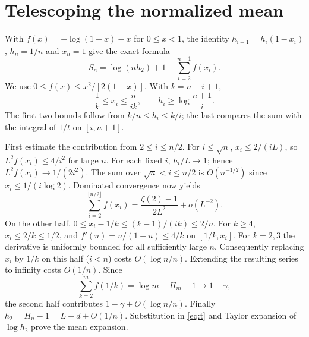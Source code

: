 \documentclass[11pt]{article}
\begin{document}
\section{Telescoping the normalized mean}
With $f(x)=-\log(1-x)-x$ for $0\le x<1$, the identity $h_{i+1}=h_i(1-x_i)$, $h_n=1/n$ and $x_n=1$ give the exact formula
\begin{equation}
 S_n=\log(n h_2)+1-\sum_{i=2}^{n-1}f(x_i).\label{eq:t}
\end{equation}
We use $0\le f(x)\le x^2/[2(1-x)]$. With $k=n-i+1$,
\begin{equation}
\frac1k\le x_i\le\frac n{ik},\qquad h_i\ge\log\frac{n+1}{i}.
\label{eq:b}
\end{equation}
The first two bounds follow from $k/n\le h_i\le k/i$; the last compares the sum with the integral of $1/t$ on $[i,n+1]$.

First estimate the contribution from $2\le i\le n/2$. For $i\le\sqrt n$, $x_i\le 2/(iL)$, so $L^2 f(x_i)\le 4/i^2$ for large $n$. For each fixed $i$, $h_i/L\to1$; hence $L^2 f(x_i)\to1/(2i^2)$. The sum over $\sqrt n<i\le n/2$ is $O(n^{-1/2})$ since $x_i\le 1/(i\log2)$. Dominated convergence now yields
\[
 \sum_{i=2}^{\lfloor n/2\rfloor} f(x_i)=\frac{\zeta(2)-1}{2L^2}+o(L^{-2}).
\]
On the other half, $0\le x_i-1/k\le(k-1)/(ik)\le 2/n$. For $k\ge4$, $x_i\le2/k\le1/2$, and $f'(u)=u/(1-u)\le4/k$ on $[1/k,x_i]$. For $k=2,3$ the derivative is uniformly bounded for all sufficiently large $n$. Consequently replacing $x_i$ by $1/k$ on this half ($i<n$) costs $O(\log n/n)$. Extending the resulting series to infinity costs $O(1/n)$. Since
\[
 \sum_{k=2}^m f(1/k)=\log m-H_m+1\longrightarrow 1-\gamma,
\]
the second half contributes $1-\gamma+O(\log n/n)$. Finally $h_2=H_n-1=L+d+O(1/n)$. Substitution in \eqref{eq:t} and Taylor expansion of $\log h_2$ prove the mean expansion.
\end{document}
